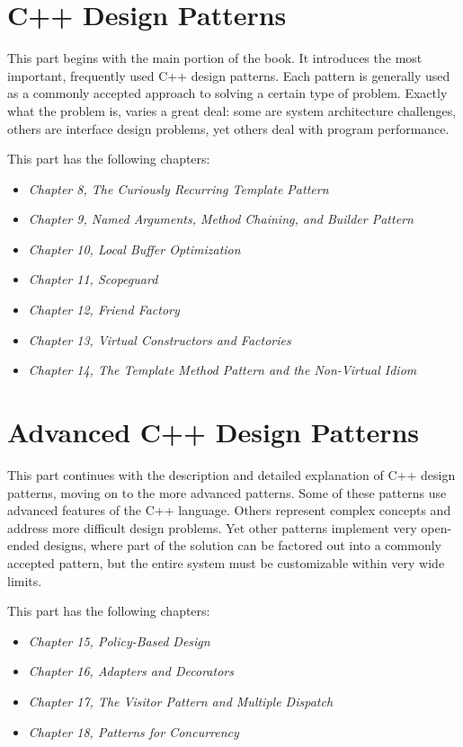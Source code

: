\part{C++ Design Patterns}

This part begins with the main portion of the book. It introduces the most important, frequently used C++ design patterns. Each pattern is generally used as a commonly accepted approach to solving a certain type of problem. Exactly what the problem is, varies a great deal: some are system architecture challenges, others are interface design problems, yet others deal with program performance.

This part has the following chapters:

\begin{itemize}
\item
  \emph{Chapter 8, The Curiously Recurring Template Pattern}
\item
  \emph{Chapter 9, Named Arguments, Method Chaining, and Builder Pattern}
\item
  \emph{Chapter 10, Local Buffer Optimization}
\item
  \emph{Chapter 11, Scopeguard}
\item
  \emph{Chapter 12, Friend Factory}
\item
  \emph{Chapter 13, Virtual Constructors and Factories}
\item
  \emph{Chapter 14, The Template Method Pattern and the Non-Virtual Idiom}
\end{itemize}


\part{Advanced C++ Design Patterns}

This part continues with the description and detailed explanation of C++ design patterns, moving on to the more advanced patterns. Some of these patterns use advanced features of the C++ language. Others represent complex concepts and address more difficult design problems. Yet other patterns implement very open-ended designs, where part of the solution can be factored out into a commonly accepted pattern, but the entire system must be customizable within very wide limits.

This part has the following chapters:

\begin{itemize}
\item
  \emph{Chapter 15, Policy-Based Design}
\item
  \emph{Chapter 16, Adapters and Decorators}
\item
  \emph{Chapter 17, The Visitor Pattern and Multiple Dispatch}
\item
  \emph{Chapter 18, Patterns for Concurrency}
\end{itemize}

